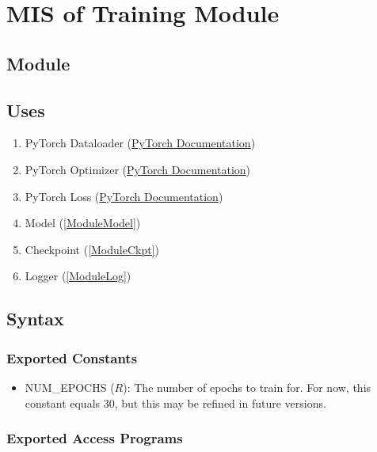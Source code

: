 \documentclass[12pt, titlepage]{article}
\begin{document}
\section{MIS of Training Module} \label{ModuleTrain} 

\subsection{Module}



\subsection{Uses}
\begin{enumerate}
  \item PyTorch Dataloader (\href{https://pytorch.org/tutorials/beginner/basics/data_tutorial.html}{PyTorch Documentation})
  \item PyTorch Optimizer (\href{https://pytorch.org/docs/stable/optim.html}{PyTorch Documentation})
  \item PyTorch Loss (\href{https://pytorch.org/docs/stable/nn.html#loss-functions}{PyTorch Documentation})
  \item Model (\ref{ModuleModel})
  \item Checkpoint (\ref{ModuleCkpt})
  \item Logger (\ref{ModuleLog})
\end{enumerate}

\subsection{Syntax}



\subsubsection{Exported Constants}

\begin{itemize}
  \item NUM\_EPOCHS ($R$): The number of epochs to train for. For now, this constant equals 30, but this may be refined in future versions.
\end{itemize}

\subsubsection{Exported Access Programs}
\end{document}
